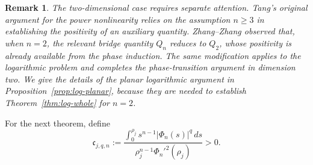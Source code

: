 \documentclass[11pt]{article}
\newtheorem*{remark*}{Remark}
\begin{document}
\begin{remark*}
{\rm The two-dimensional case requires separate attention. Tang's original
argument \cite{Tang} for the power nonlinearity relies on the assumption $n\geq3$
in establishing the positivity of an auxiliary quantity.
Zhang--Zhang \cite{ZhangZhang} observed that, when $n=2$, the relevant bridge quantity $Q_n$
reduces to $Q_2$, whose positivity is already available from the phase
induction. The same modification applies to the logarithmic problem
and completes the phase-transition argument in dimension two. {We
give the details of the planar logarithmic argument in
Proposition~\ref{prop:log-planar}, because they are needed to establish
Theorem~\ref{thm:log-whole} for $n=2$.}}
\end{remark*}

For the next theorem, define
\begin{equation}\label{eq:sub-constant-intro}
 \mathfrak c_{j,q,n}
 :=\frac{\displaystyle\int_0^{\rho_j}
 s^{n-1}|\Phi_n(s)|^q\,ds}
 {\rho_j^{n-1}\Phi_n'^2(\rho_j)}>0.
\end{equation}
\end{document}
